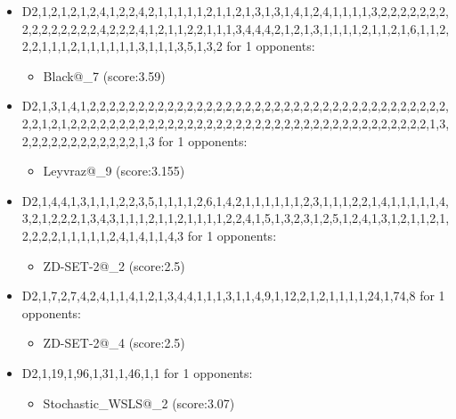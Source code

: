 \begin{appendices}
\begin{itemize}
        \item D2,1,2,1,2,1,2,4,1,2,2,4,2,1,1,1,1,1,2,1,1,2,1,3,1,3,1,4,1,2,4,1,1,1,1,3,2,2,2,2,2,2,2,2,2,2,2,2,2,2,2,4,2,2,2,4,1,2,1,1,2,2,1,1,1,3,4,4,4,2,1,2,1,3,1,1,1,1,2,1,1,2,1,6,1,1,2,2,2,1,1,1,2,1,1,1,1,1,1,3,1,1,1,3,5,1,3,2 for 1 opponents:
        \begin{multicols}{3}
            \begin{itemize}
                \item Black@\_7 (score:3.59)
            \end{itemize}
        \end{multicols}

        \item D2,1,3,1,4,1,2,2,2,2,2,2,2,2,2,2,2,2,2,2,2,2,2,2,2,2,2,2,2,2,2,2,2,2,2,2,2,2,2,2,2,2,2,2,2,1,2,1,2,2,2,2,2,2,2,2,2,2,2,2,2,2,2,2,2,2,2,2,2,2,2,2,2,2,2,2,2,2,2,2,2,2,2,2,2,1,3,2,2,2,2,2,2,2,2,2,2,2,2,1,3 for 1 opponents:
        \begin{multicols}{3}
            \begin{itemize}
                \item Leyvraz@\_9 (score:3.155)
            \end{itemize}
        \end{multicols}

        \item D2,1,4,4,1,3,1,1,1,2,2,3,5,1,1,1,1,2,6,1,4,2,1,1,1,1,1,1,2,3,1,1,1,2,2,1,4,1,1,1,1,1,4,3,2,1,2,2,2,1,3,4,3,1,1,1,2,1,1,2,1,1,1,1,2,2,4,1,5,1,3,2,3,1,2,5,1,2,4,1,3,1,2,1,1,2,1,2,2,2,2,1,1,1,1,1,2,4,1,4,1,1,4,3 for 1 opponents:
        \begin{multicols}{3}
            \begin{itemize}
                \item ZD-SET-2@\_2 (score:2.5)
            \end{itemize}
        \end{multicols}

        \item D2,1,7,2,7,4,2,4,1,1,4,1,2,1,3,4,4,1,1,1,3,1,1,4,9,1,12,2,1,2,1,1,1,1,24,1,74,8 for 1 opponents:
        \begin{multicols}{3}
            \begin{itemize}
                \item ZD-SET-2@\_4 (score:2.5)
            \end{itemize}
        \end{multicols}

        \item D2,1,19,1,96,1,31,1,46,1,1 for 1 opponents:
        \begin{multicols}{3}
            \begin{itemize}
                \item Stochastic\_WSLS@\_2 (score:3.07)
            \end{itemize}
        \end{multicols}


\end{itemize}
\end{appendices}
